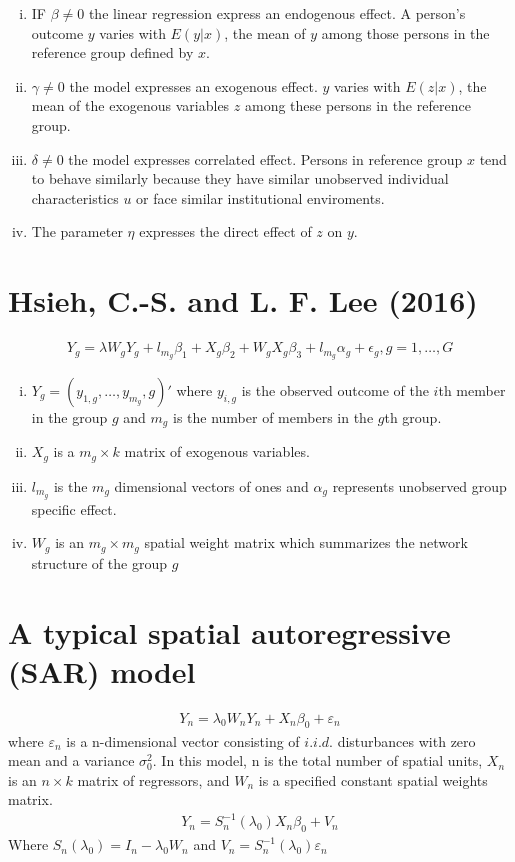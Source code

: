 \documentclass[11pt]{article}
\begin{document}
\begin{enumerate}[(i)]
\item IF $\beta \neq 0$ the linear regression express an endogenous effect. A person's outcome $y$ varies with $E(y|x)$, the mean of $y$ among those persons in the reference group defined by $x$.
\item $\gamma \neq 0$ the model expresses an exogenous effect. $y$ varies with $E(z|x)$, the mean of the exogenous variables $z$ among these persons in the reference group.
\item $\delta \neq 0$ the model expresses correlated effect. Persons in reference group $x$ tend to behave similarly because they have similar unobserved individual characteristics $u$ or face similar institutional enviroments.
\item The parameter $\eta$ expresses the direct effect of $z$ on $y$.
\end{enumerate}

\section{Hsieh, C.-S. and L. F. Lee (2016)}
\begin{align}
Y_g = \lambda W_g Y_g + l_{m_g}\beta_1 + X_g \beta_2 + W_g X_g \beta_3 + l_{m_g}\alpha_g +\epsilon_g, g= 1, \dots, G
\end{align}
\begin{enumerate}[(i)]
\item $Y_g=(y_{1,g},\dots,y_{m_g},g)'$ where $y_{i,g}$ is the observed outcome of the $i$th member in the group $g$ and $m_g$ is the number of members in the $g$th group.
\item $X_g$ is a $m_g \times k$ matrix of exogenous variables.
\item $l_{m_g}$ is the $m_g$ dimensional vectors of ones and $\alpha_g$ represents unobserved group specific effect.
\item $W_g$ is an $m_g \times m_g$ spatial weight matrix which summarizes the network structure of the group $g$
\end{enumerate}

\section{A typical spatial autoregressive (SAR) model}
\begin{align}
Y_n = \lambda_0 W_n Y_n + X_n \beta_0 + \varepsilon_n
\end{align}
where $\varepsilon_n$ is a n-dimensional vector consisting of $i.i.d.$ disturbances with zero mean and a variance $\sigma_0^2$. In this model, n is the total number of spatial units, $X_n$ is an $n \times k$ matrix of regressors, and $W_n$ is a specified constant spatial weights matrix.
\begin{align}
Y_n = S_n^{-1} (\lambda_{0}) X_{n} \beta_0 + V_n
\end{align}
Where $ S_n(\lambda_{0}) = I_n - \lambda_0 W_n$ and $V_n = S_n^{-1} (\lambda_{0}) \varepsilon_n$
\end{document}
